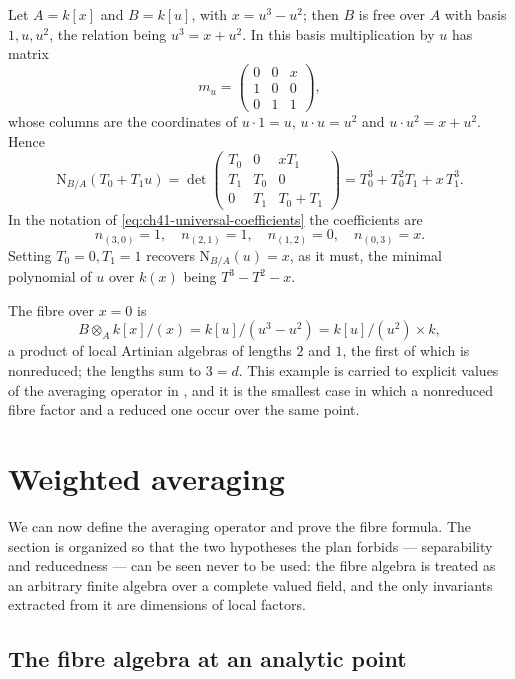 \begin{example}
\label{ex:ch41-cubic-norm}
Let $A=k[x]$ and $B=k[u]$, with $x=u^3-u^2$; then $B$ is free over
$A$ with basis $1,u,u^2$, the relation being $u^3=x+u^2$.  In this
basis multiplication by $u$ has matrix
\[
 m_u=\begin{pmatrix}0&0&x\\1&0&0\\0&1&1\end{pmatrix},
\]
whose columns are the coordinates of $u\cdot1=u$, $u\cdot u=u^2$ and
$u\cdot u^2=x+u^2$.  Hence
\[
 \mathrm N_{B/A}(T_0+T_1u)
 =\det\begin{pmatrix}
 T_0&0&xT_1\\ T_1&T_0&0\\ 0&T_1&T_0+T_1
 \end{pmatrix}
 =T_0^3+T_0^2T_1+x\,T_1^3 .
\tag{41.19}\label{eq:ch41-cubic-norm}
\]
In the notation of \eqref{eq:ch41-universal-coefficients} the coefficients
are
\[
 n_{(3,0)}=1,\quad n_{(2,1)}=1,\quad n_{(1,2)}=0,\quad n_{(0,3)}=x .
\]
Setting $T_0=0,T_1=1$ recovers $\mathrm N_{B/A}(u)=x$, as it must, the
minimal polynomial of $u$ over $k(x)$ being $T^3-T^2-x$.

The fibre over $x=0$ is
\[
 B\otimes_Ak[x]/(x)=k[u]/(u^3-u^2)=k[u]/(u^2)\times k ,
\]
a product of local Artinian algebras of lengths $2$ and $1$, the first
of which is nonreduced; the lengths sum to $3=d$.  This example is carried
to explicit values of the averaging operator in
, and it is the smallest case in which a
nonreduced fibre factor and a reduced one occur over the same point.
\end{example}

\section{Weighted averaging}
\label{sec:ch41-averaging}

We can now define the averaging operator and prove the fibre formula.  The
section is organized so that the two hypotheses the plan forbids ---
separability and reducedness --- can be seen never to be used: the fibre
algebra is treated as an arbitrary finite algebra over a complete valued
field, and the only invariants extracted from it are dimensions of local
factors.

\subsection{The fibre algebra at an analytic point}
\label{sec:ch41-fibre-algebra}

